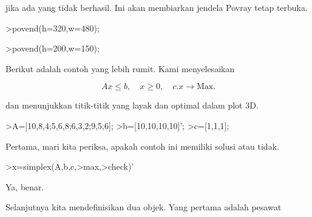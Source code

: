 \documentclass[a4paper,10pt]{article}
\begin{document}
\begin{eulernotebook}
\begin{eulercomment}
jika ada yang tidak berhasil. Ini akan membiarkan jendela Povray tetap
terbuka.
\end{eulercomment}
\begin{eulerprompt}
>povend(h=320,w=480);
\end{eulerprompt}
\begin{eulerprompt}
>povend(h=200,w=150);
\end{eulerprompt}
\begin{eulercomment}
Berikut adalah contoh yang lebih rumit. Kami menyelesaikan

\end{eulercomment}
\begin{eulerformula}
\[
Ax \le b, \quad x \ge 0, \quad c.x \to \text{Max.}
\]
\end{eulerformula}
\begin{eulercomment}
dan menunjukkan titik-titik yang layak dan optimal dalam plot 3D.
\end{eulercomment}
\begin{eulerprompt}
>A=[10,8,4;5,6,8;6,3,2;9,5,6];
>b=[10,10,10,10]';
>c=[1,1,1];
\end{eulerprompt}
\begin{eulercomment}
Pertama, mari kita periksa, apakah contoh ini memiliki solusi atau
tidak.
\end{eulercomment}
\begin{eulerprompt}
>x=simplex(A,b,c,>max,>check)'
\end{eulerprompt}
\begin{euleroutput}
  [0,  1,  0.5]
\end{euleroutput}
\begin{eulercomment}
Ya, benar.

Selanjutnya kita mendefinisikan dua objek. Yang pertama adalah pesawat


\end{eulercomment}
\end{eulernotebook}
\end{document}
